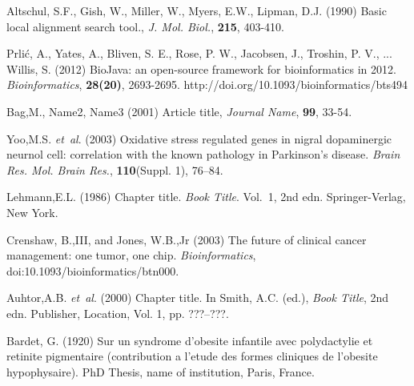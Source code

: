 \documentclass{bioinfo}
\begin{document}
\begin{thebibliography}{}

Altschul, S.F., Gish, W., Miller, W., Myers, E.W., Lipman, D.J. (1990) Basic local alignment search tool., {\it J. Mol. Biol.}, {\bf 215}, 403-410.

Prli\'{c}, A., Yates, A., Bliven, S. E., Rose, P. W., Jacobsen, J., Troshin, P. V., ... Willis, S. (2012) BioJava: an open-source framework for bioinformatics in 2012. {\it Bioinformatics}, {\bf 28(20)}, 2693-2695. http://doi.org/10.1093/bioinformatics/bts494

Bag,M., Name2, Name3 (2001) Article title, {\it Journal Name}, {\bf 99}, 33-54.

Yoo,M.S. \textit{et~al}. (2003) Oxidative stress regulated genes
in nigral dopaminergic neurnol cell: correlation with the known
pathology in Parkinson's disease. \textit{Brain Res. Mol. Brain
Res.}, \textbf{110}(Suppl. 1), 76--84.

Lehmann,E.L. (1986) Chapter title. \textit{Book Title}. Vol.~1, 2nd edn. Springer-Verlag, New York.

Crenshaw, B.,III, and Jones, W.B.,Jr (2003) The future of clinical
cancer management: one tumor, one chip. \textit{Bioinformatics},
doi:10.1093/bioinformatics/btn000.

Auhtor,A.B. \textit{et~al}. (2000) Chapter title. In Smith, A.C.
(ed.), \textit{Book Title}, 2nd edn. Publisher, Location, Vol. 1, pp.
???--???.

Bardet, G. (1920) Sur un syndrome d'obesite infantile avec
polydactylie et retinite pigmentaire (contribution a l'etude des
formes cliniques de l'obesite hypophysaire). PhD Thesis, name of
institution, Paris, France.

\end{thebibliography}
\end{document}

